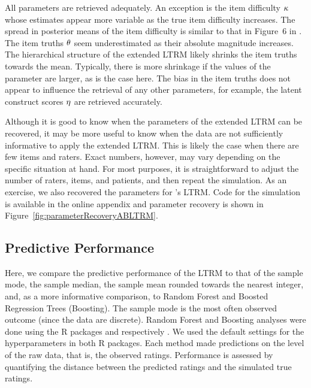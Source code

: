 \documentclass[a4paper,usenames,dvipsnames]{article}
\newenvironment{revision}{\color{black}}{\color{black}}
\newenvironment{revisionN}{\color{black}}{\color{black}}
\begin{document}
All parameters are retrieved adequately. An exception is the item difficulty $\kappa$ whose estimates appear more variable as the true item difficulty increases. The spread in posterior means of the item difficulty is similar to that in Figure~6 in \AB{}. The item truths $\theta$ seem underestimated as their absolute magnitude increases. The hierarchical structure of the extended LTRM likely shrinks the item truths towards the mean. Typically, there is more shrinkage if the values of the parameter are larger, as is the case here. The bias in the item truths does not appear to influence the retrieval of any other parameters, for example, the latent construct scores $\eta$ are retrieved accurately.

Although it is good to know when the parameters of the extended LTRM can be recovered, it may be more useful to know when the data are not sufficiently informative to apply the extended LTRM. This is likely the case when there are few items and raters. Exact numbers, however, may vary depending on the specific situation at hand. For most purposes, it is straightforward to adjust the number of raters, items, and patients, and then repeat the simulation. As an exercise, we also recovered the parameters for \AB{}'s LTRM. Code for the simulation is available in the online appendix and parameter recovery is shown in Figure~\ref{fig:parameterRecoveryABLTRM}.

\subsection*{Predictive Performance}
Here, we compare the predictive performance of the LTRM to that of the sample mode\protect\begin{revision}, the sample median, the sample mean rounded towards the nearest integer, \protect\end{revision} and, as a more informative comparison, to Random Forest and Boosted Regression Trees (Boosting).
The sample mode is the most often observed outcome (since the data are discrete).
Random Forest and Boosting analyses were done using the R packages  and  respectively \cite{ranger2017, gbmPackage}. We used the default settings for the hyperparameters in both R packages. \begin{revisionN}Each method made predictions on the level of the raw data, that is, the observed ratings. Performance is assessed by quantifying the distance between the predicted ratings and the simulated true ratings.\end{revisionN}
\end{document}
